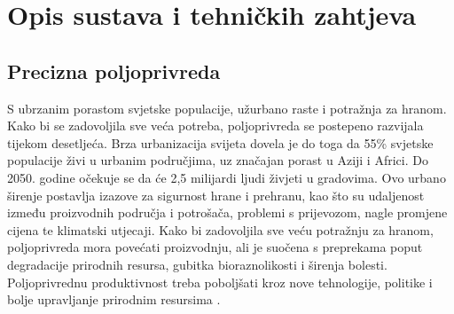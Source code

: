 \chapter{Opis sustava i tehničkih zahtjeva}

\section{Precizna poljoprivreda}

S ubrzanim porastom svjetske populacije, užurbano raste i potražnja za hranom. Kako bi se zadovoljila sve veća potreba, poljoprivreda se postepeno razvijala tijekom desetljeća. Brza urbanizacija svijeta dovela je do toga da 55\% svjetske populacije živi u urbanim područjima, uz značajan porast u Aziji i Africi. Do 2050. godine očekuje se da će 2,5 milijardi ljudi živjeti u gradovima. Ovo urbano širenje postavlja izazove za sigurnost hrane i prehranu, kao što su udaljenost između proizvodnih područja i potrošača, problemi s prijevozom, nagle promjene cijena te klimatski utjecaji. Kako bi zadovoljila sve veću potražnju za hranom, poljoprivreda mora povećati proizvodnju, ali je suočena s preprekama poput degradacije prirodnih resursa, gubitka bioraznolikosti i širenja bolesti. Poljoprivrednu produktivnost treba poboljšati kroz nove tehnologije, politike i bolje upravljanje prirodnim resursima \cite{modern_challenges}. 

